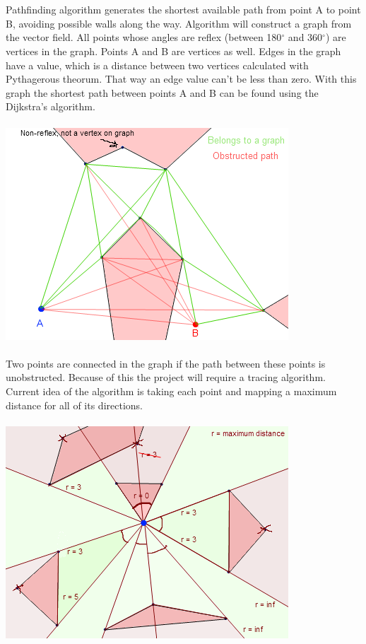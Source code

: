 \documentclass[a4paper,12pt]{article}
\begin{document}
\\
\\
Pathfinding algorithm generates the shortest available path from point A to point B,
avoiding possible walls along the way. Algorithm will construct a graph from the vector field.
All points whose angles are reflex (between 180$^\circ$ and 360$^\circ$) are vertices in the graph. Points A and B are vertices as well. Edges in the graph have a value, which is a distance between two vertices calculated with Pythagerous theorum. That way an edge value can't be less than zero. With this graph the shortest path between points A and B can be found using the Dijkstra's algorithm.
\\
\\
\includegraphics[scale=0.65]{graph.png}
\\
\\
Two points are connected in the graph if the path between these points is unobstructed.
Because of this the project will require a tracing algorithm. Current idea of the algorithm is taking each point and mapping a maximum distance for all of its directions.
\\
\\
\includegraphics[scale=0.65]{trace.png}
\end{document}
